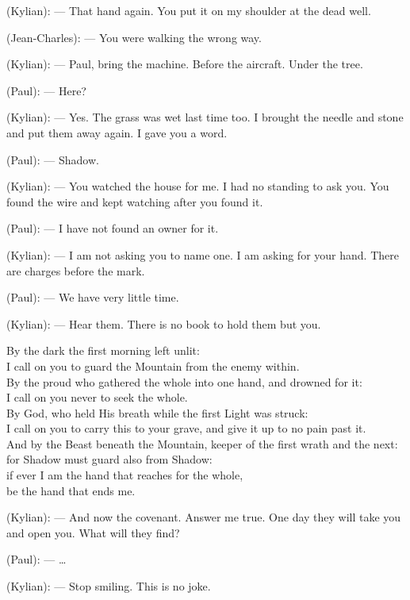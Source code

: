 \begin{room}
(Kylian): --- That hand again. You put it on my shoulder at the dead well.

(Jean-Charles): --- You were walking the wrong way.

(Kylian): --- Paul, bring the machine. Before the aircraft. Under the tree.

\centerline{}

(Paul): --- Here?

(Kylian): --- Yes. The grass was wet last time too. I brought the needle and stone and put them away again. I gave you a word.

(Paul): --- Shadow.

(Kylian): --- You watched the house for me. I had no standing to ask you. You found the wire and kept watching after you found it.

(Paul): --- I have not found an owner for it.

(Kylian): --- I am not asking you to name one. I am asking for your hand. There are charges before the mark.

(Paul): --- We have very little time.

(Kylian): --- Hear them. There is no book to hold them but you.

\begin{scripture}
By the dark the first morning left unlit: \\
I call on you to guard the Mountain from the enemy within. \\
By the proud who gathered the whole into one hand, and drowned for it: \\
I call on you never to seek the whole. \\
By God, who held His breath while the first Light was struck: \\
I call on you to carry this to your grave, and give it up to no pain past it. \\
And by the Beast beneath the Mountain, keeper of the first wrath and the next: \\
for Shadow must guard also from Shadow: \\
if ever I am the hand that reaches for the whole, \\
be the hand that ends me.
\end{scripture}

(Kylian): --- And now the covenant. Answer me true. One day they will take you and open you. What will they find?

(Paul): --- \ldots{}

(Kylian): --- Stop smiling. This is no joke.


\end{room}
